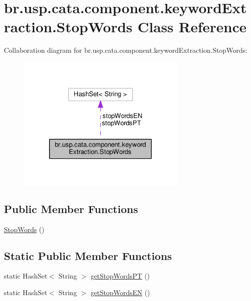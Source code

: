 \hypertarget{classbr_1_1usp_1_1cata_1_1component_1_1keyword_extraction_1_1_stop_words}{\section{br.\+usp.\+cata.\+component.\+keyword\+Extraction.\+Stop\+Words Class Reference}
\label{classbr_1_1usp_1_1cata_1_1component_1_1keyword_extraction_1_1_stop_words}
}


Collaboration diagram for br.\+usp.\+cata.\+component.\+keyword\+Extraction.\+Stop\+Words\+:\nopagebreak
\begin{figure}[H]
\begin{center}
\leavevmode
\includegraphics[width=236pt]{classbr_1_1usp_1_1cata_1_1component_1_1keyword_extraction_1_1_stop_words__coll__graph}
\end{center}
\end{figure}
\subsection*{Public Member Functions}
\begin{DoxyCompactItemize}
\item 
\hyperlink{classbr_1_1usp_1_1cata_1_1component_1_1keyword_extraction_1_1_stop_words_ae2962924d97afcef1f3c041efa05a12e}{Stop\+Words} ()
\end{DoxyCompactItemize}
\subsection*{Static Public Member Functions}
\begin{DoxyCompactItemize}
\item 
static Hash\+Set$<$ String $>$ \hyperlink{classbr_1_1usp_1_1cata_1_1component_1_1keyword_extraction_1_1_stop_words_a6257e827435690106f80234ccea33718}{get\+Stop\+Words\+P\+T} ()
\item 
static Hash\+Set$<$ String $>$ \hyperlink{classbr_1_1usp_1_1cata_1_1component_1_1keyword_extraction_1_1_stop_words_a11e7a43249098655392e81f79cd4b57b}{get\+Stop\+Words\+E\+N} ()
\end{DoxyCompactItemize}
